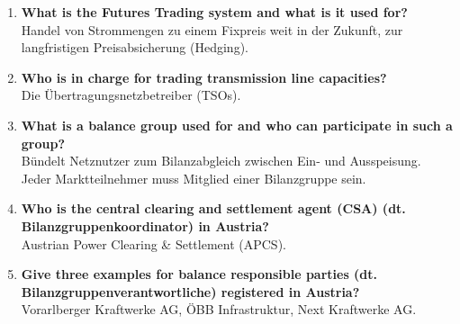 \documentclass{article}
\begin{document}
\begin{enumerate}
    \item \textbf{What is the Futures Trading system and what is it used for?} \\
    Handel von Strommengen zu einem Fixpreis weit in der Zukunft, zur langfristigen Preisabsicherung (Hedging).
    \item \textbf{Who is in charge for trading transmission line capacities?} \\
    Die Übertragungsnetzbetreiber (TSOs).
    \item \textbf{What is a balance group used for and who can participate in such a group?} \\
    Bündelt Netznutzer zum Bilanzabgleich zwischen Ein- und Ausspeisung. Jeder Marktteilnehmer muss Mitglied einer Bilanzgruppe sein.
    \item \textbf{Who is the central clearing and settlement agent (CSA) (dt. Bilanzgruppenkoordinator) in Austria?} \\
    Austrian Power Clearing \& Settlement (APCS).
    \item \textbf{Give three examples for balance responsible parties (dt. Bilanzgruppenverantwortliche) registered in Austria?} \\
    Vorarlberger Kraftwerke AG, ÖBB Infrastruktur, Next Kraftwerke AG.
\end{enumerate}
\end{document}
